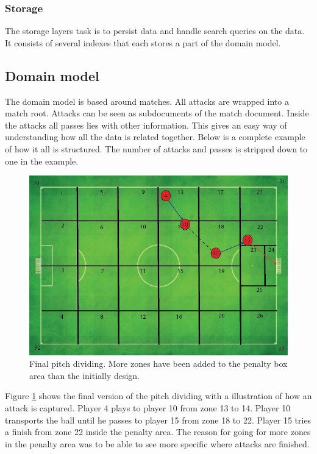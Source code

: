 \subsubsection{Storage}

The storage layers task is to persist data and handle search queries on the data. It consists of several indexes that each stores a part of the domain model. 

\subsection{Domain model}

The domain model is based around matches. All attacks are wrapped into a match root. Attacks can be seen as subdocuments of the match document. Inside the attacks all passes lies with other information. This gives an easy way of understanding how all the data is related together. Below is a complete example of how it all is structured. The number of attacks and passes is stripped down to one in the example.


\label{list:domainmodel}

\begin{figure}[ht!]
\centering
\includegraphics[width=1\textwidth]{images/general/capture_illustration.png}
\caption{Final pitch dividing. More zones have been added to the penalty box area than the initially design. }
\label{fig:finalPitchDividing}
\end{figure}

Figure \ref{fig:finalPitchDividing} shows the final version of the pitch dividing with a illustration of how an attack is captured. Player 4 plays to player 10 from zone 13 to 14. Player 10 transports the ball until he passes to player 15 from zone 18 to 22. Player 15 tries a finish from zone 22 inside the penalty area. The reason for going for more zones in the penalty area was to be able to see more specific where attacks are finished.

